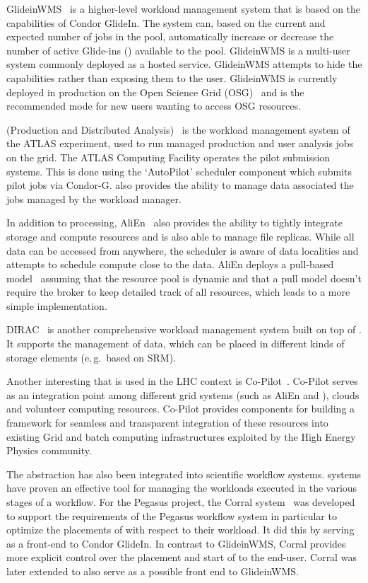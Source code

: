 \documentclass{sig-alternate}
\begin{document}
GlideinWMS~\cite{1742-6596-119-6-062044} is a higher-level workload management
system that is based on the \pilot capabilities of Condor GlideIn. The system
can, based on the current and expected number of jobs in the pool,
automatically increase or decrease the number of active Glide-ins (\pilots)
available to the pool. GlideinWMS is a multi-user \pilotjob system commonly
deployed as a hosted service. GlideinWMS attempts to hide the \pilot
capabilities rather than exposing them to the user. GlideinWMS is currently
deployed in production on the Open Science Grid (OSG)~\cite{url_osg} and is the
recommended mode for new users wanting to access OSG resources.

\panda (Production and Distributed Analysis)~\cite{1742-6596-331-7-072069} is
the workload management system of the ATLAS experiment, used to run managed
production and user analysis jobs on the grid. The ATLAS Computing Facility
operates the pilot submission systems. This is done using the \panda
`AutoPilot' scheduler component which submits pilot jobs via Condor-G. \panda
also provides the ability to manage data associated the jobs managed by the
\panda workload manager.

In addition to processing, AliEn~\cite{1742-6596-119-6-062012} also provides
the ability to tightly integrate storage and compute resources and is also able
to manage file replicas. While all data can be accessed from anywhere, the
scheduler is aware of data localities and attempts to schedule compute close to
the data. AliEn deploys a pull-based model~\cite{Saiz:2003:alien} assuming that
the resource pool is dynamic and that a pull model doesn't require the broker
to keep detailed track of all resources, which leads to a more simple
implementation.

DIRAC~\cite{1742-6596-219-6-062049} is another comprehensive workload
management system built on top of \pilots. It supports the management of data,
which can be placed in different kinds of storage elements (e.\,g.\ based on
SRM).

Another interesting \pilot that is used in the LHC context is
Co-Pilot~\cite{copilot-tr}. Co-Pilot serves as an integration point among
different grid \pilotjob systems (such as AliEn and \panda), clouds and
volunteer computing resources. Co-Pilot provides components for building a
framework for seamless and transparent integration of these resources into
existing Grid and batch computing infrastructures exploited by the High Energy
Physics community.

The \pilot abstraction has also been integrated into scientific workflow
systems. \pilot systems have proven an effective tool for managing the
workloads executed in the various stages of a workflow. For the Pegasus
project, the Corral system~\cite{Rynge:2011:EUG:2116259.2116599} was developed
to support the requirements of the Pegasus workflow system in particular to
optimize the placements of \pilots with respect to their workload. It did this
by serving as a front-end to Condor GlideIn. In contrast to GlideinWMS, Corral
provides more explicit control over the placement and start of \pilots to the
end-user. Corral was later extended to also serve as a possible front end to
GlideinWMS.
\end{document}
